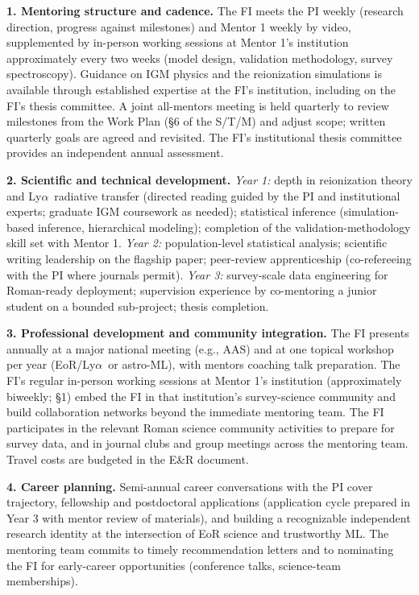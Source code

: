 \documentclass[12pt,letterpaper]{article}
\newcommand{\lya}{Ly$\alpha$}
\begin{document}
\noindent\textbf{1. Mentoring structure and cadence.}
The FI meets the PI weekly (research direction, progress against
milestones) and Mentor 1 weekly by video, supplemented by in-person
working sessions at Mentor 1's institution approximately every two
weeks (model design, validation methodology, survey spectroscopy). Guidance on IGM physics and the reionization
simulations is available through established expertise at the FI's
institution, including on the FI's thesis committee. A joint
all-mentors meeting is held quarterly to review milestones from the Work
Plan (\S6 of the S/T/M) and adjust scope; written quarterly goals are
agreed and revisited. The FI's institutional thesis committee provides an
independent annual assessment.

\noindent\textbf{2. Scientific and technical development.}
\emph{Year 1:} depth in reionization theory and \lya\ radiative transfer
(directed reading guided by the PI and institutional experts; graduate
IGM coursework as needed); statistical inference (simulation-based
inference, hierarchical modeling); completion of the
validation-methodology skill set with Mentor 1. \emph{Year 2:} population-level statistical analysis;
scientific writing leadership on the flagship paper; peer-review
apprenticeship (co-refereeing with the PI where journals permit).
\emph{Year 3:} survey-scale data engineering for Roman-ready deployment;
supervision experience by co-mentoring a junior student on a bounded
sub-project; thesis completion.

\noindent\textbf{3. Professional development and community integration.}
The FI presents annually at a major national meeting (e.g., AAS) and at
one topical workshop per year (EoR/\lya\ or astro-ML), with mentors
coaching talk preparation. The FI's regular in-person working sessions
at Mentor 1's institution (approximately biweekly; \S1) embed the FI in
that institution's survey-science community and build collaboration
networks beyond the immediate mentoring team. The FI participates in the relevant Roman
science community activities to prepare for survey data, and in journal
clubs and group meetings across the mentoring team. Travel costs are
budgeted in the E\&R document.

\noindent\textbf{4. Career planning.}
Semi-annual career conversations with the PI cover trajectory,
fellowship and postdoctoral applications (application cycle prepared in
Year 3 with mentor review of materials), and building a recognizable
independent research identity at the intersection of EoR science and
trustworthy ML. The mentoring team commits to timely recommendation
letters and to nominating the FI for early-career opportunities
(conference talks, science-team memberships).
\end{document}
